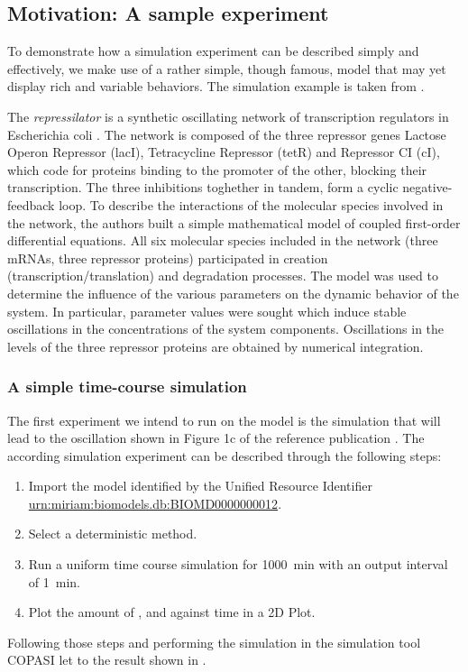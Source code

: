 \subsection{Motivation: A sample experiment}
\label{motivation:example}
To demonstrate how a simulation experiment can be described simply and effectively, we make use of a rather simple, though famous, model that may yet display rich and variable behaviors. The simulation example is taken from \citep{Waltemath:2010}. 

The \emph{repressilator} is a synthetic oscillating network of transcription regulators in Escherichia coli \citep{Elowitz:2000}.
 The network is composed of the three repressor genes Lactose Operon Repressor (lacI), Tetracycline Repressor (tetR) and Repressor CI (cI), which code for proteins binding to the promoter of the other, blocking their transcription. The three inhibitions toghether in tandem, form a cyclic negative-feedback loop. 
To describe the interactions of the molecular species involved in the network, the authors built a simple mathematical model of coupled first-order differential equations. All six molecular species included in the network (three mRNAs, three repressor proteins) participated in creation (transcription/translation) and degradation processes. The model was used to determine the influence of the various parameters on the dynamic behavior of the system. In particular, parameter values were sought which induce stable oscillations in the concentrations of the system components. Oscillations in the levels of the three repressor proteins are obtained by numerical integration. 

\subsubsection{A simple time-course simulation}
\label{sec:intro1}
The first experiment we intend to run on the model is the simulation that will lead to the oscillation shown in Figure 1c of the reference publication \citep{Elowitz:2000}. The according simulation experiment can be described through the following steps:

\begin{enumerate}
	\item{Import the model identified by the Unified Resource Identifier \citep{Berners-Lee:2005} \url{urn:miriam:biomodels.db:BIOMD0000000012}.}
	\item{Select a deterministic method.}
	\item{Run a uniform time course simulation for 1000~min with an output interval of 1~min.}
	\item{Plot the amount of ,  and  against time in a 2D Plot.}
\end{enumerate}
Following those steps and performing the simulation in the simulation tool COPASI \citep{Hoops:2006} let to the result shown in . 

